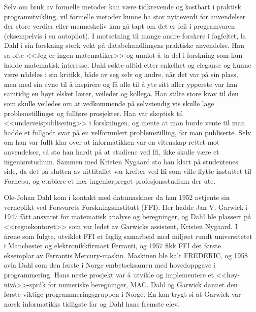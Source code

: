 Selv om bruk av formelle metoder kan være tidkrevende og kostbart i praktisk programutvikling, vil formelle metoder kunne ha stor nytteverdi for anvendelser der store verdier eller menneskeliv kan gå tapt om det er feil i programvaren (eksempelvis i en autopilot). I motsetning til mange andre forskere i fagfeltet, la Dahl i sin forskning sterk vekt på databehandlingens praktiske anvendelse. Han sa ofte <<Jeg er ingen matematiker>> og unnlot å ta del i forskning som kun hadde matematisk interesse. Dahl søkte alltid etter enkelhet og eleganse og kunne være nådeløs i sin kritikk, både av seg selv og andre, når det var på sin plass, men med sin evne til å inspirere og få alle til å yte sitt aller ypperste var han samtidig en høyt elsket lærer, veileder og kollega. Han stilte store krav til den som skulle veiledes om at vedkommende på selvstendig vis skulle lage problemstillinger og fullføre prosjekter. Han var skeptisk til <<underveispublisering>> i forskningen, og mente at man burde vente til man hadde et fullgodt svar på en velformulert problemstilling, før man publiserte. Selv om han var fullt klar over at informatikken var en vitenskap rettet mot anvendelser, så sto han hardt på at studiene ved Ifi, ikke skulle være et ingeniørstudium. Sammen med Kristen Nygaard sto han klart på studentenes side, da det på slutten av nittitallet var krefter ved Ifi som ville flytte instuttet til Fornebu, og etablere et mer ingeniørpreget profesjonsstudium der ute.

Ole-Johan Dahl kom i kontakt med datamaskiner da han 1952 avtjente sin verneplikt ved Forsvarets Forskningsinstitutt (FFI). Her hadde Jan V. Garwick i 1947 fått ansvaret for matematisk analyse og beregninger, og Dahl ble plassert på <<regnekontoret>> som var ledet av Garwicks assistent, Kristen Nygaard. I årene som fulgte, utviklet FFI et faglig samarbeid med miljøet rundt universitetet i Manchester og elektronikkfirmaet Ferranti, og 1957 fikk FFI det første eksemplar av Ferrantis Mercury-maskin. Maskinen ble kalt FREDERIC, og 1958 avla Dahl som den første i Norge embetseksamen med hovedoppgave i programmering. Hans neste prosjekt var å utvikle og implementere et <<høy-nivå>>-språk for numeriske beregninger, MAC. Dahl og Garwick dannet den første viktige programmeringsgruppen i Norge. En kan trygt si at Garwick var norsk informatikks tidligste far og Dahl hans fremste elev.

